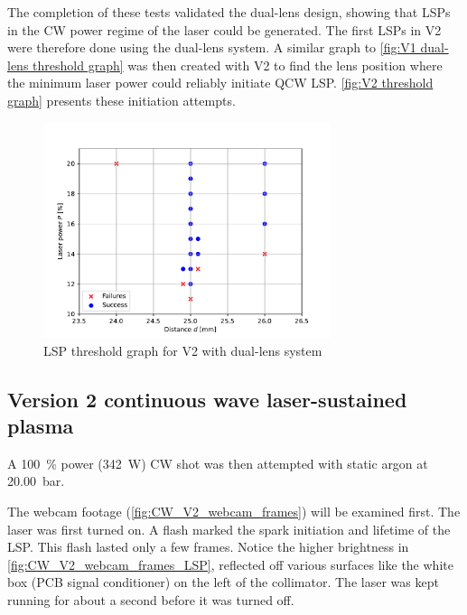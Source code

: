             The completion of these tests validated the dual-lens design, showing that LSPs in the CW power regime of the laser could be generated. The first LSPs in V2 were therefore done using the dual-lens system. A similar graph to \autoref{fig:V1 dual-lens threshold graph} was then created with V2 to find the lens position where the minimum laser power could reliably initiate QCW LSP. \autoref{fig:V2 threshold graph} presents these initiation attempts.
            \begin{figure}[!ht]
                \centering
                \includegraphics[width=0.75\textwidth]{assets/4 experiments/V2_focus_threshold.pdf}
                \caption{LSP threshold graph for V2 with dual-lens system}
                \label{fig:V2 threshold graph}
            \end{figure}

        \subsection{Version 2 continuous wave laser-sustained plasma}

            A \qty{100}{\%} power (\qty{342}{W}) CW shot was then attempted with static argon at \qty{20.00}{bar}. 

            

            The webcam footage (\autoref{fig:CW_V2_webcam_frames}) will be examined first. The laser was first turned on. A flash marked the spark initiation and lifetime of the LSP. This flash lasted only a few frames. Notice the higher brightness in \autoref{fig:CW_V2_webcam_frames_LSP}, reflected off various surfaces like the white box (PCB signal conditioner) on the left of the collimator. The laser was kept running for about a second before it was turned off.

